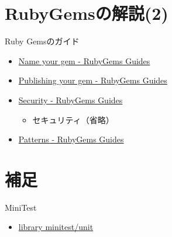 \documentclass[t, aspectratio=169]{beamer}
\begin{document}
\section{RubyGemsの解説(2)}
\label{sec-2-2}
\begin{frame}[label=sec-2-2-1]{Ruby Gemsのガイド}
\begin{itemize}
\item \href{http://guides.rubygems.org/name-your-gem/}{Name your gem - RubyGems Guides}
\item \href{http://guides.rubygems.org/publishing/}{Publishing your gem - RubyGems Guides}
\item \href{http://guides.rubygems.org/security/}{Security - RubyGems Guides}
\begin{itemize}
\item セキュリティ（省略）
\end{itemize}
\item \href{http://guides.rubygems.org/patterns/}{Patterns - RubyGems Guides}
\end{itemize}
\end{frame}
\section{補足}
\label{sec-2-3}
\begin{frame}[label=sec-2-3-1]{MiniTest}
\begin{itemize}
\item \href{http://docs.ruby-lang.org/ja/2.0.0/library/minitest=2funit.html}{library minitest/unit}
\end{itemize}
\end{frame}
\end{document}
